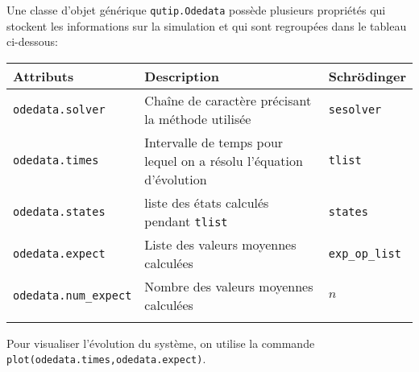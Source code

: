 Une classe d'objet générique \texttt{qutip.Odedata} possède plusieurs propriétés 
qui stockent les informations sur la simulation et qui sont regroupées dans le 
tableau ci-dessous:
\centering
\begin{tabular}{|l|l|l} \hline \hline
\textbf{Attributs} & \textbf{Description} & \textbf{Schrödinger}\\ \hline \hline
\texttt{odedata.solver} & Chaîne de caractère précisant la méthode utilisée & 
\texttt{sesolver}\\ \hline
\texttt{odedata.times} & Intervalle de temps pour lequel on a résolu 
l'équation d'évolution & \texttt{tlist}\\ \hline
\texttt{odedata.states} & liste des états calculés pendant \texttt{tlist} & 
\texttt{states} \\ \hline
\texttt{odedata.expect} & Liste des valeurs moyennes calculées & 
\texttt{exp\_op\_list} \\ \hline
\texttt{odedata.num\_expect} & Nombre des valeurs moyennes calculées & $n$ \\ 
\hline
\\\hline
\end{tabular}

Pour visualiser l'évolution du système, on utilise la commande 
\texttt{plot(odedata.times,odedata.expect)}.


